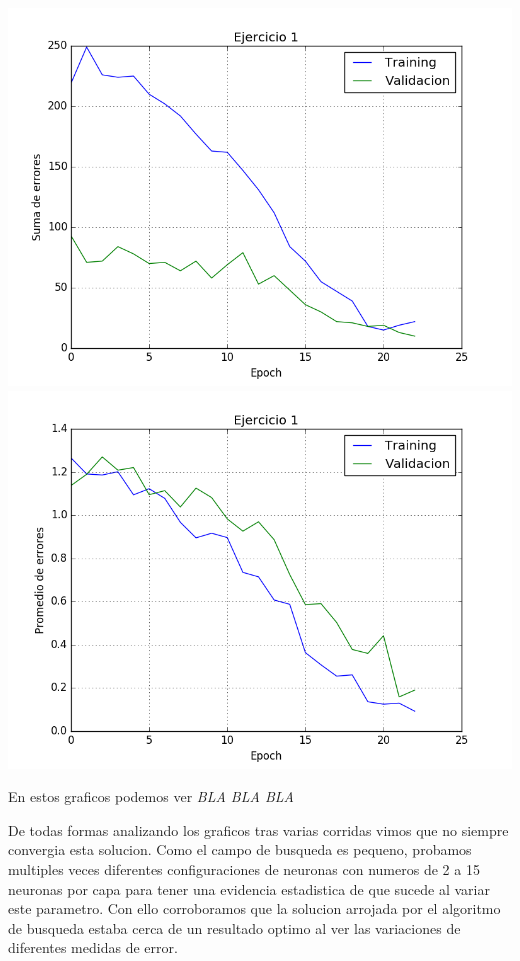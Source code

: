 \includegraphics[scale=0.4]{img/ej100109155sum}
\includegraphics[scale=0.4]{img/ej100109155mean}

En estos graficos podemos ver \emph{\color{red} BLA BLA BLA}

De todas formas analizando los graficos tras varias corridas vimos que no siempre convergia esta solucion.
Como el campo de busqueda es pequeno, probamos multiples veces diferentes configuraciones de neuronas con numeros de 2 a 15 neuronas por capa para tener una evidencia estadistica de que sucede al variar este parametro. Con ello corroboramos que la solucion arrojada por el algoritmo de busqueda estaba cerca de un resultado optimo al ver las variaciones de diferentes medidas de error. 

